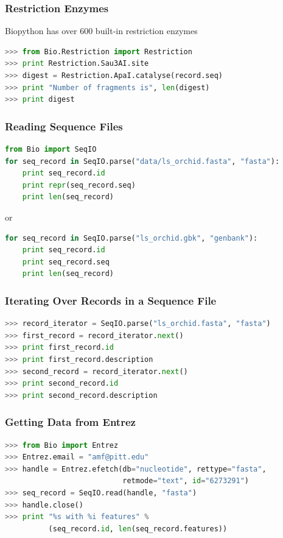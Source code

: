 \documentclass[xcolor=table,10pt,final]{beamer}
\begin{document}
\begin{frame}[fragile]
	\frametitle{Restriction Enzymes}
	Biopython has over 600 built-in restriction enzymes
	\begin{lstlisting}[language=python]
>>> from Bio.Restriction import Restriction
>>> print Restriction.Sau3AI.site
>>> digest = Restriction.ApaI.catalyse(record.seq)
>>> print "Number of fragments is", len(digest)
>>> print digest
	\end{lstlisting}


\end{frame}



\begin{frame}[fragile]
	\frametitle{Reading Sequence Files}
	\begin{lstlisting}[language=python]
from Bio import SeqIO
for seq_record in SeqIO.parse("data/ls_orchid.fasta", "fasta"):
	print seq_record.id
	print repr(seq_record.seq)
	print len(seq_record)
	\end{lstlisting}
or
	\begin{lstlisting}[language=python]
for seq_record in SeqIO.parse("ls_orchid.gbk", "genbank"):
	print seq_record.id
	print seq_record.seq
	print len(seq_record)
	\end{lstlisting}
\end{frame}



\begin{frame}[fragile]
	\frametitle{Iterating Over Records in a Sequence File}
	\begin{lstlisting}[language=python]
>>> record_iterator = SeqIO.parse("ls_orchid.fasta", "fasta")
>>> first_record = record_iterator.next()
>>> print first_record.id
>>> print first_record.description
>>> second_record = record_iterator.next()
>>> print second_record.id
>>> print second_record.description
	\end{lstlisting}
\end{frame}


\begin{frame}[fragile]
	\frametitle{Getting Data from Entrez}
	\begin{lstlisting}[language=python]
>>> from Bio import Entrez
>>> Entrez.email = "amf@pitt.edu"
>>> handle = Entrez.efetch(db="nucleotide", rettype="fasta",
                           retmode="text", id="6273291")
>>> seq_record = SeqIO.read(handle, "fasta")
>>> handle.close()
>>> print "%s with %i features" % 
          (seq_record.id, len(seq_record.features))
	\end{lstlisting}
\end{frame}
\end{document}
